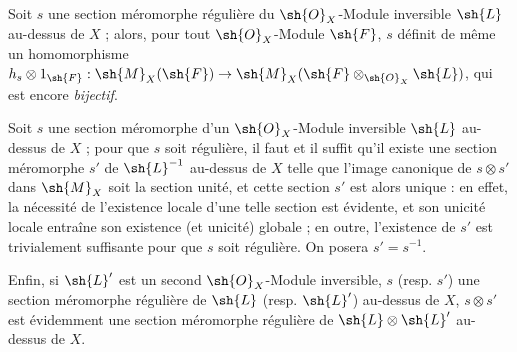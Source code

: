 \begin{env}[20.1.9]
\label{IV.20.1.9}
Soit $s$ une section méromorphe régulière du $\sh{O}_X$-Module inversible $\sh{L}$ au-dessus de $X$ ; alors, pour tout $\sh{O}_X$-Module $\sh{F}$, $s$ définit de même un homomorphisme $h_s\otimes1_{\sh{F}}:\sh{M}_X(\sh{F})\to\sh{M}_X(\sh{F}\otimes_{\sh{O}_X}\sh{L})$, qui est encore \emph{bijectif}.
\end{env}

\begin{env}[20.1.10]
\label{IV.20.1.10}
Soit $s$ une section méromorphe d'un $\sh{O}_X$-Module inversible $\sh{L}$ au-dessus de $X$ ; pour que $s$ soit régulière, il faut et il suffit qu'il existe une section méromorphe $s'$ de $\sh{L}^{-1}$ au-dessus de $X$ telle que l'image canonique de $s\otimes s'$ dans $\sh{M}_X$  soit la section unité, et cette section $s'$ est alors unique : en effet, la nécessité de l'existence locale d'une telle section est évidente, et son unicité locale entraîne son existence (et unicité) globale ; en outre, l'existence de $s'$ est trivialement suffisante pour que $s$ soit régulière.
On posera $s'=s^{-1}$.

Enfin, si $\sh{L}'$ est un second $\sh{O}_X$-Module inversible, $s$ (resp. $s'$) une section méromorphe régulière de $\sh{L}$ (resp. $\sh{L}'$) au-dessus de $X$, $s\otimes s'$ est évidemment une section méromorphe régulière de $\sh{L}\otimes\sh{L}'$ au-dessus de $X$.
\end{env}

